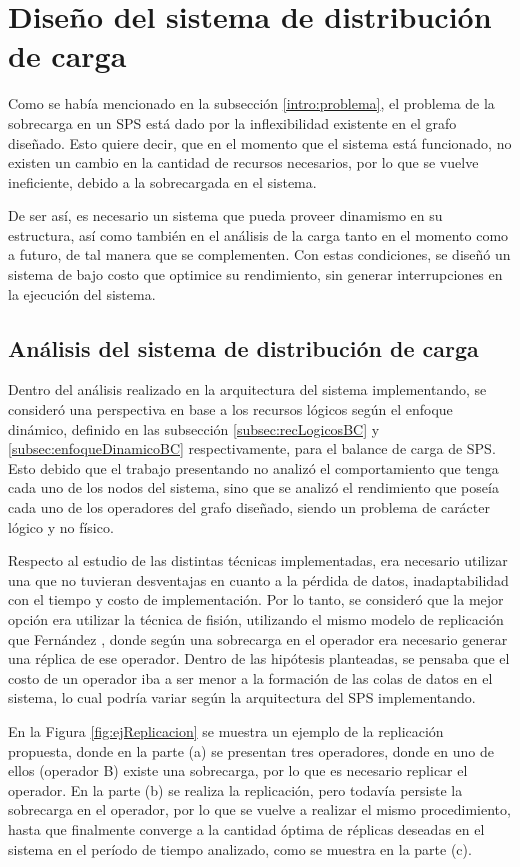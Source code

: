 \chapter{Dise\~no del sistema de distribución de carga}
\label{cap:disenoSistema}

Como se había mencionado en la subsección \ref{intro:problema}, el problema de la sobrecarga en un SPS está dado por la inflexibilidad existente en el grafo diseñado. Esto quiere decir, que en el momento que el sistema está funcionado, no existen un cambio en la cantidad de recursos necesarios, por lo que se vuelve ineficiente, debido a la sobrecargada en el sistema.

De ser así, es necesario un sistema que pueda proveer dinamismo en su estructura, así como también en el análisis de la carga tanto en el momento como a futuro, de tal manera que se complementen. Con estas condiciones, se diseñó un sistema de bajo costo que optimice su rendimiento, sin generar interrupciones en la ejecución del sistema.

\section{Análisis del sistema de distribución de carga}
Dentro del análisis realizado en la arquitectura del sistema implementando, se consideró una perspectiva en base a los recursos lógicos según el enfoque dinámico, definido en las subsección \ref{subsec:recLogicosBC} y \ref{subsec:enfoqueDinamicoBC} respectivamente, para el balance de carga de SPS. Esto debido que el trabajo presentando no analizó el comportamiento que tenga cada uno de los nodos del sistema, sino que se analizó el rendimiento que poseía cada uno de los operadores del grafo diseñado, siendo un problema de carácter lógico y no físico.

Respecto al estudio de las distintas técnicas implementadas, era necesario utilizar una que no tuvieran desventajas en cuanto a la pérdida de datos, inadaptabilidad con el tiempo y costo de implementación. Por lo tanto, se consideró que la mejor opción era utilizar la técnica de fisión, utilizando el mismo modelo de replicación que Fernández \citep{FernandezMKP13}, donde según una sobrecarga en el operador era necesario generar una réplica de ese operador. Dentro de las hipótesis planteadas, se pensaba que el costo de un operador iba a ser menor a la formación de las colas de datos en el sistema, lo cual podría variar según la arquitectura del SPS implementando.

En la Figura \ref{fig:ejReplicacion} se muestra un ejemplo de la replicación propuesta, donde en la parte (a) se presentan tres operadores, donde en uno de ellos (operador B) existe una sobrecarga, por lo que es necesario replicar el operador. En la parte (b) se realiza la replicación, pero todavía persiste la sobrecarga en el operador, por lo que se vuelve a realizar el mismo procedimiento, hasta que finalmente converge a la cantidad óptima de réplicas deseadas en el sistema en el período de tiempo analizado, como se muestra en la parte (c).

